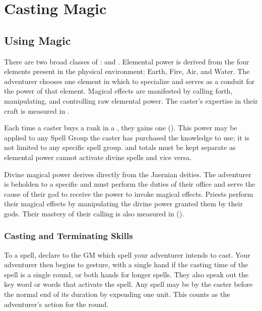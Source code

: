 \chapter{Casting Magic}
\label{ch:casting-magic}
\setlength{\columnsep}{\defcolwidth}\begin{multicols*}{2}
\section{Using Magic}
There are two broad classes of :  and . Elemental power is derived from the four elements present in the physical environment: Earth, Fire, Air, and Water. The adventurer chooses one element in which to specialize and serves as a conduit for the power of that element. Magical effects are manifested by calling forth, manipulating, and controlling raw elemental power. The caster's expertise in their craft is measured in .

Each time a caster buys a rank in a , they gains one  (\EU). This power may be applied to any Spell Group the caster has purchased the knowledge to use; it is not limited to any specific spell group.   and  totals must be kept separate as elemental power cannot activate divine spells and vice versa.

Divine magical power derives directly from the Jaernian deities. The adventurer is beholden to a specific  and must perform the duties of their office and serve the cause of their god to receive the power to invoke magical effects. Priests perform their magical effects by manipulating the divine power granted them by their gods. Their mastery of their calling is also measured in  (\DU).
\subsection{Casting and Terminating Skills}
To  a spell, declare to the GM which spell your adventurer intends to cast. Your adventurer then begins to gesture, with a single hand if the casting time of the spell is a single round, or both hands for longer spells. They also speak out the key word or words that activate the spell. Any spell may be  by the caster before
the normal end of its duration by expending one unit. This counts as the adventurer's action for the round.

\end{multicols*}
